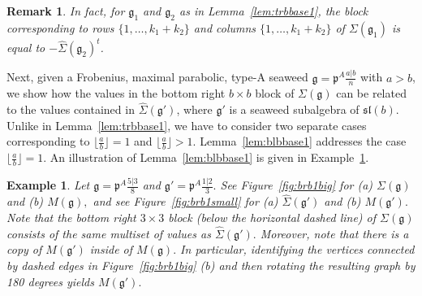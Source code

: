 \documentclass[letterpaper,10pt]{article}
\newtheorem{Ex}[theorem]{Example}
\newtheorem{remark}[theorem]{Remark}
\begin{document}
\begin{remark}
In fact, for $\mathfrak{g}_1$ and $\mathfrak{g}_2$ as in Lemma~\ref{lem:trbbase1}, the block corresponding to rows $\{1,\hdots,k_1+k_2\}$ and columns $\{1,\hdots,k_1+k_2\}$ of $\Sigma(\mathfrak{g}_1)$ is equal to $-\widehat{\Sigma}(\mathfrak{g}_2)^t$.
\end{remark}

Next, given a Frobenius, maximal parabolic, type-A seaweed $\mathfrak{g}=\mathfrak{p}^A\frac{a|b}{n}$ with $a>b$, we show how the values in the bottom right $b\times b$ block of $\Sigma(\mathfrak{g})$ can be related to the values contained in $\widehat{\Sigma}(\mathfrak{g}')$, where $\mathfrak{g}'$ is a seaweed subalgebra of $\mathfrak{sl}(b)$. Unlike in Lemma~\ref{lem:trbbase1}, we have to consider two separate cases corresponding to $\lfloor\frac{a}{b}\rfloor=1$ and $\lfloor\frac{a}{b}\rfloor>1$. Lemma~\ref{lem:blbbase1} addresses the case $\lfloor\frac{a}{b}\rfloor=1$. An illustration of Lemma~\ref{lem:blbbase1} is given in Example~\ref{ex:brb1}.

\begin{Ex}\label{ex:brb1}
Let $\mathfrak{g}=\mathfrak{p}^A\frac{5|3}{8}$ and $\mathfrak{g}'=\mathfrak{p}^A\frac{1|2}{3}.$ See Figure~\ref{fig:brb1big} for \textup{(a)} $\Sigma(\mathfrak{g})$ and \textup{(b)} $M(\mathfrak{g}),$ and see Figure~\ref{fig:brb1small} for \textup{(a)} $\widehat{\Sigma}(\mathfrak{g}')$ and \textup{(b)} $M(\mathfrak{g}').$ Note that the bottom right $3\times 3$ block \textup(below the horizontal dashed line\textup) of $\Sigma(\mathfrak{g})$ consists of the same multiset of values as $\widehat{\Sigma}(\mathfrak{g}').$ Moreover, note that there is a copy of $M(\mathfrak{g}')$ inside of $M(\mathfrak{g}).$ In particular, identifying the vertices connected by dashed edges in Figure~\ref{fig:brb1big} \textup{(b)} and then rotating the resulting graph by 180 degrees yields $M(\mathfrak{g}').$
\end{Ex}
\end{document}

